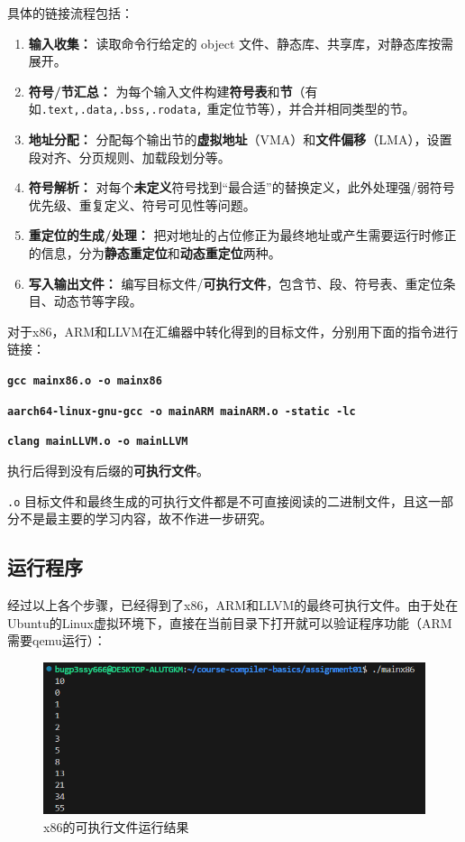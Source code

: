 \documentclass[UTF8,a4paper,10pt]{ctexart}
\begin{document}
具体的链接流程包括：
\begin{enumerate}
    \item \textbf{输入收集：} 读取命令行给定的 object 文件、静态库、共享库，对静态库按需展开。
    \item \textbf{符号/节汇总：} 为每个输入文件构建\textbf{符号表}和\textbf{节}（有如\texttt{.text,.data,.bss,.rodata,} 重定位节等），并合并相同类型的节。
    \item \textbf{地址分配：} 分配每个输出节的\textbf{虚拟地址}（VMA）和\textbf{文件偏移}（LMA），设置段对齐、分页规则、加载段划分等。
    \item \textbf{符号解析：} 对每个\textbf{未定义}符号找到“最合适”的替换定义，此外处理强/弱符号优先级、重复定义、符号可见性等问题。
    \item \textbf{重定位的生成/处理：} 把对地址的占位修正为最终地址或产生需要运行时修正的信息，分为\textbf{静态重定位}和\textbf{动态重定位}两种。
    \item \textbf{写入输出文件：} 编写目标文件/\textbf{可执行文件}，包含节、段、符号表、重定位条目、动态节等字段。
\end{enumerate}

对于x86，ARM和LLVM在汇编器中转化得到的目标文件，分别用下面的指令进行链接：
\begin{center}
    \textcolor{deepblue}{\textbf{\texttt{\large{gcc mainx86.o -o mainx86}}}}
\end{center}

\begin{center}
    \textcolor{deepblue}{\textbf{\texttt{\large{aarch64-linux-gnu-gcc -o mainARM mainARM.o -static -lc}}}}
\end{center}

\begin{center}
    \textcolor{deepblue}{\textbf{\texttt{\large{clang mainLLVM.o -o mainLLVM}}}}
\end{center}

执行后得到没有后缀的\textbf{可执行文件}。

\texttt{.o} 目标文件和最终生成的可执行文件都是不可直接阅读的二进制文件，且这一部分不是最主要的学习内容，故不作进一步研究。

\vspace{1em}

\subsection{运行程序}
经过以上各个步骤，已经得到了x86，ARM和LLVM的最终可执行文件。由于处在Ubuntu的Linux虚拟环境下，直接在当前目录下打开就可以验证程序功能（ARM需要qemu运行）：
\begin{figure} [H]
    \centering
    \includegraphics[width=0.75\linewidth]{run_1.png}
    \caption{x86的可执行文件运行结果}
    \label{fig:placeholder}
\end{figure}
\end{document}
